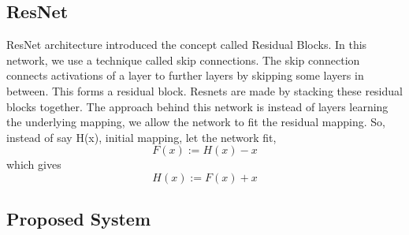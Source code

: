         \subsection{ResNet}
            ResNet architecture introduced the concept called Residual Blocks. In this network, we use a technique called skip connections. The skip connection connects activations of a  layer to further layers by skipping some layers in between. This forms a residual block. Resnets are made by stacking these residual blocks together. The approach behind this network is instead of layers learning the underlying mapping, we allow the network to fit the residual mapping. So, instead of say H(x), initial mapping, let the network fit,
            \begin{equation}
                F(x) := H(x) - x
            \end{equation}
            which gives
            \begin{equation}
                H(x) := F(x) + x
            \end{equation}
            \begin{figure}[hbt!]
            \end{figure}

        \subsection{Proposed System}


